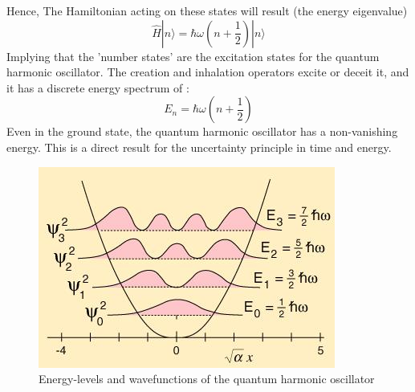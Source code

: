 Hence, The Hamiltonian acting on these states will result (the energy eigenvalue) 
\begin{equation}
\hat{H} |n\rangle = \hbar \omega (n+\frac{1}{2}) |n\rangle
\end{equation}
Implying that the 'number states' are the excitation states for the quantum harmonic oscillator. The creation and inhalation operators excite or deceit it, and it has a discrete energy spectrum of :
\begin{equation}
E_n = \hbar \omega \left( n+ \frac{1}{2}\right) 
\end{equation}  
Even in the ground state, the quantum harmonic oscillator has a non-vanishing energy. This is a direct result for the uncertainty principle in time and energy. 
\begin{figure}[h!]
	\centering
	
	\includegraphics[scale= .7]{./figures/qsho}
	\caption{Energy-levels and wavefunctions of the quantum harmonic oscillator }
\end{figure}
